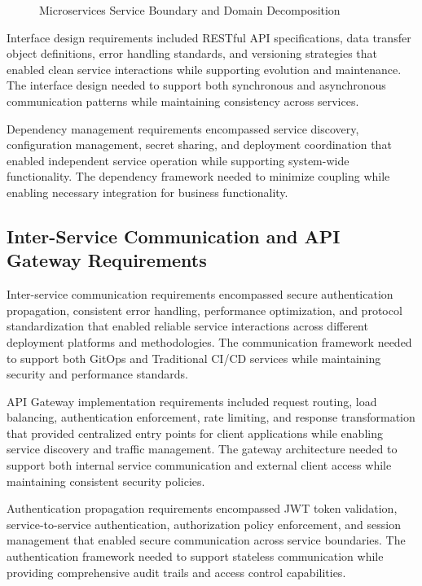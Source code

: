 \begin{figure}[H]
\centering
\caption{Microservices Service Boundary and Domain Decomposition}
\label{fig:microservices-decomposition}
\end{figure}

Interface design requirements included RESTful API specifications, data transfer object definitions, error handling standards, and versioning strategies that enabled clean service interactions while supporting evolution and maintenance. The interface design needed to support both synchronous and asynchronous communication patterns while maintaining consistency across services.

Dependency management requirements encompassed service discovery, configuration management, secret sharing, and deployment coordination that enabled independent service operation while supporting system-wide functionality. The dependency framework needed to minimize coupling while enabling necessary integration for business functionality.


\subsection{Inter-Service Communication and API Gateway Requirements}

Inter-service communication requirements encompassed secure authentication propagation, consistent error handling, performance optimization, and protocol standardization that enabled reliable service interactions across different deployment platforms and methodologies. The communication framework needed to support both GitOps and Traditional CI/CD services while maintaining security and performance standards.

API Gateway implementation requirements included request routing, load balancing, authentication enforcement, rate limiting, and response transformation that provided centralized entry points for client applications while enabling service discovery and traffic management. The gateway architecture needed to support both internal service communication and external client access while maintaining consistent security policies.

Authentication propagation requirements encompassed JWT token validation, service-to-service authentication, authorization policy enforcement, and session management that enabled secure communication across service boundaries. The authentication framework needed to support stateless communication while providing comprehensive audit trails and access control capabilities.

